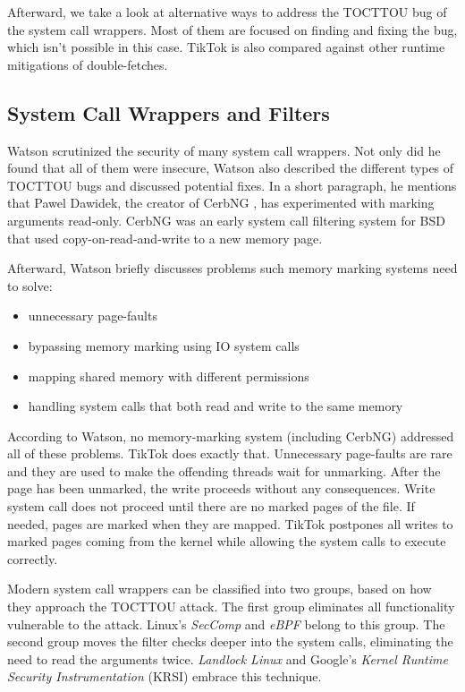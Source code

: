 Afterward, we take a look at alternative ways to address the TOCTTOU bug of the
system call wrappers. Most of them are focused on finding and fixing the bug,
which isn't possible in this case. TikTok is also compared against other runtime
mitigations of double-fetches.

\subsection{System Call Wrappers and Filters}

Watson \cite{watson2007exploiting} scrutinized the security of many system call
wrappers. Not only did he found that all of them were insecure, Watson also
described the different types of TOCTTOU bugs and discussed potential fixes. In
a short paragraph, he mentions that Pawel Dawidek, the creator of CerbNG
\cite{zak_frasunek_dawidek}, has experimented with marking arguments read-only.
CerbNG was an early system call filtering system for BSD that used
copy-on-read-and-write to a new memory page.

Afterward, Watson briefly discusses problems such memory marking systems
need to solve: 
\begin{itemize}
    \item unnecessary page-faults
    \item bypassing memory marking using IO system calls
    \item mapping shared memory with different permissions
    \item handling system calls that both read and write to the same memory
\end{itemize}

According to Watson, no memory-marking system (including CerbNG) addressed all
of these problems. TikTok does exactly that. Unnecessary page-faults are rare
and they are used to make the offending threads wait for unmarking. After the
page has been unmarked, the write proceeds without any consequences. Write
system call does not proceed until there are no marked pages of the file. If
needed, pages are marked when they are mapped. TikTok postpones all writes to
marked pages coming from the kernel while allowing the system calls to execute
correctly.

Modern system call wrappers can be classified into two groups, based on how they
approach the TOCTTOU attack. The first group eliminates all functionality
vulnerable to the attack. Linux's \emph{SecComp}\cite{seccomp} and
\emph{eBPF}\cite{ebpf} belong to this group. The second group moves the filter
checks deeper into the system calls, eliminating the need to read the arguments
twice. \emph{Landlock Linux} \cite{landlock} and Google's \emph{Kernel Runtime
Security Instrumentation} (KRSI)\cite{krsi} embrace this technique.

